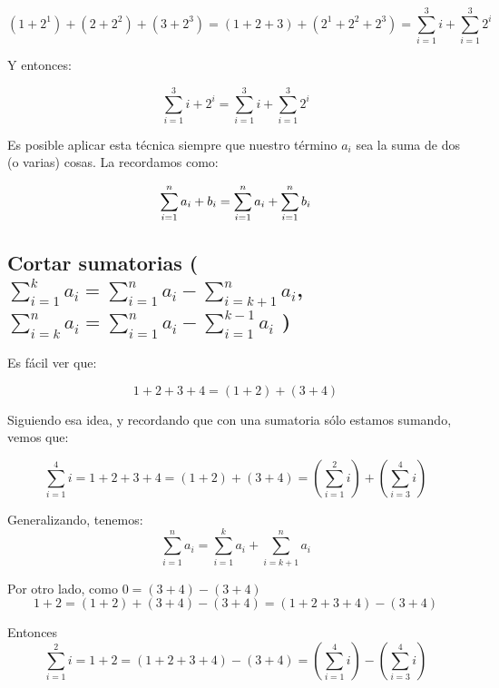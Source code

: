 \begin{equation*} (1+2^1) + (2+2^2) + (3+2^3) = (1+2+3) + (2^1+2^2+2^3) =  \sum_{i=1}^3{i} + \sum_{i=1}^3{2^i}
\end{equation*}

Y entonces:

\begin{equation*}
\sum_{i=1}^3{i+2^i} = \sum_{i=1}^3{i} + \sum_{i=1}^3{2^i}
\end{equation*}

Es posible aplicar esta técnica siempre que nuestro término $a_i$ sea la suma de dos (o varias) cosas. La recordamos como:

\begin{equation*}
\sum_{i=1}^n{a_i+b_i}=\sum_{i=1}^n{ a_i} + \sum_{i=1}^n{b_i}
\end{equation*}

\newcommand{\cortado}{\sum_{i=1}^n{a_i} = \sum_{i=1}^k{a_i} + \sum_{i=k+1}^n{a_i}}
\newcommand{\completadoArriba}{\sum_{i=1}^k{a_i} = \sum_{i=1}^n{a_i} - \sum_{i=k+1}^n{a_i}}
\newcommand{\completadoAbajo}{\sum_{i=k}^n{a_i} = \sum_{i=1}^n{a_i} - \sum_{i=1}^{k-1}{a_i}}

\subsection{Cortar sumatorias ($\completadoArriba$, $\completadoAbajo$ )}

Es fácil ver que:

\begin{equation*}
1+2+3+4 = (1+2) + (3+4)
\end{equation*}

Siguiendo esa idea, y recordando que con una sumatoria sólo estamos sumando, vemos que:

\begin{equation*}
\sum_{i=1}^4{i} = 1+2+3+4 = (1+2) + (3+4) = (\sum_{i=1}^2{i}) + (\sum_{i=3}^4{i}) 
\end{equation*} 

Generalizando, tenemos:
\begin{equation*}
\cortado
\end{equation*}

Por otro lado, como $0=(3+4) -(3+4)$
\begin{equation*}
1+2 = (1+2) + (3+4) -(3+4) = (1+2+3+4) - (3+4)
\end{equation*}

Entonces
\begin{equation*}
\sum_{i=1}^2{i} = 1+2 = (1+2+3+4) - (3+4) = (\sum_{i=1}^4{i}) - (\sum_{i=3}^4{i})
\end{equation*}

